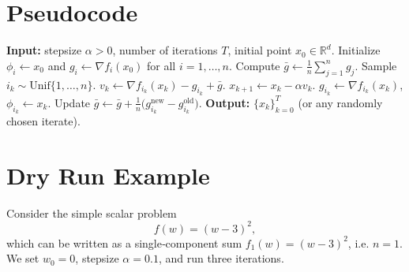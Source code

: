 \documentclass{article}
\newcommand{\R}{\mathbb{R}}
\begin{document}
\section*{Pseudocode}
\begin{algorithm}[H]
\caption{SAGA for Non‑Convex Smooth Objectives}
\begin{algorithmic}[1]
\State \textbf{Input:} stepsize $\alpha>0$, number of iterations $T$,
initial point $x_0\in\R^{d}$.
\State Initialize $\phi_i\gets x_0$ and $g_i\gets\nabla f_i(x_0)$ for all $i=1,\dots,n$.
\State Compute $\bar g\gets \frac1n\sum_{j=1}^{n}g_j$.
    \State Sample $i_k\sim\text{Unif}\{1,\dots,n\}$.
    \State $v_k\gets \nabla f_{i_k}(x_k)-g_{i_k}+\bar g$.\hfill{}
    \State $x_{k+1}\gets x_k-\alpha v_k$.\hfill{}
    \State $g_{i_k}\gets \nabla f_{i_k}(x_k)$,\;
          $\phi_{i_k}\gets x_k$.\hfill{}
    \State Update $\bar g\gets \bar g+\frac{1}{n}\bigl(g_{i_k}^{\text{new}}-g_{i_k}^{\text{old}}\bigr)$.
\EndFor
\State \textbf{Output:} $\{x_k\}_{k=0}^{T}$ (or any randomly chosen iterate).
\end{algorithmic}
\end{algorithm}

\section*{Dry Run Example}
Consider the simple scalar problem
\[
f(w)= (w-3)^2,
\]
which can be written as a single‑component sum $f_1(w)= (w-3)^2$, i.e. $n=1$.
We set $w_0=0$, stepsize $\alpha=0.1$, and run three iterations.
\end{document}
